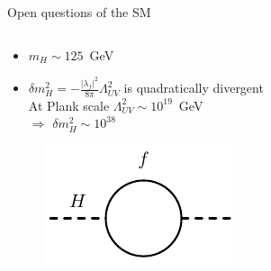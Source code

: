 \documentclass{beamer}
\begin{document}
\begin{frame}{Open questions of the SM}
\begin{columns}
\begin{column}{0.7\textwidth}
\begin{itemize}
                \begin{itemize}
                    \item $m_H \sim 125$~GeV
                    \item $\delta m^2_H = - \frac{|\lambda_{f}|^{2}}{8\pi}\Lambda_{UV}^{2}$ is quadratically divergent\\
                    At Plank scale $\Lambda_{UV}^{2} \sim 10^{19}$~GeV\\ $\Rightarrow$ $\delta m^2_H \sim 10^{38}$
                \end{itemize}
                \vspace{-0.5cm}
                \begin{figure}
                    \includegraphics[scale=1.0]{figures/one-loop-correction-1.pdf}
                \end{figure}
            \end{itemize}
        \end{column}
    \end{columns}
    
\end{frame}
\end{document}
